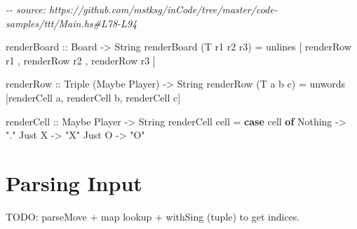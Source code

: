 \documentclass[]{article}
\newenvironment{Shaded}{}{}
\newcommand{\CommentTok}[1]{\textcolor[rgb]{0.38,0.63,0.69}{\textit{#1}}}
\newcommand{\DataTypeTok}[1]{\textcolor[rgb]{0.56,0.13,0.00}{#1}}
\newcommand{\FunctionTok}[1]{\textcolor[rgb]{0.02,0.16,0.49}{#1}}
\newcommand{\KeywordTok}[1]{\textcolor[rgb]{0.00,0.44,0.13}{\textbf{#1}}}
\newcommand{\NormalTok}[1]{#1}
\newcommand{\OtherTok}[1]{\textcolor[rgb]{0.00,0.44,0.13}{#1}}
\newcommand{\StringTok}[1]{\textcolor[rgb]{0.25,0.44,0.63}{#1}}
\begin{document}
\begin{Shaded}
\begin{Highlighting}[]
\CommentTok{{-}{-} source: https://github.com/mstksg/inCode/tree/master/code{-}samples/ttt/Main.hs\#L78{-}L94}

\OtherTok{renderBoard ::} \DataTypeTok{Board} \OtherTok{{-}\textgreater{}} \DataTypeTok{String}
\NormalTok{renderBoard (}\DataTypeTok{T}\NormalTok{ r1 r2 r3) }\OtherTok{=}
    \FunctionTok{unlines}
\NormalTok{        [ renderRow r1}
\NormalTok{        , renderRow r2}
\NormalTok{        , renderRow r3}
\NormalTok{        ]}

\OtherTok{renderRow ::} \DataTypeTok{Triple}\NormalTok{ (}\DataTypeTok{Maybe} \DataTypeTok{Player}\NormalTok{) }\OtherTok{{-}\textgreater{}} \DataTypeTok{String}
\NormalTok{renderRow (}\DataTypeTok{T}\NormalTok{ a b c) }\OtherTok{=}
    \FunctionTok{unwords}\NormalTok{ [renderCell a, renderCell b, renderCell c]}

\OtherTok{renderCell ::} \DataTypeTok{Maybe} \DataTypeTok{Player} \OtherTok{{-}\textgreater{}} \DataTypeTok{String}
\NormalTok{renderCell cell }\OtherTok{=} \KeywordTok{case}\NormalTok{ cell }\KeywordTok{of}
    \DataTypeTok{Nothing} \OtherTok{{-}\textgreater{}} \StringTok{"."}
    \DataTypeTok{Just} \DataTypeTok{X} \OtherTok{{-}\textgreater{}} \StringTok{"X"}
    \DataTypeTok{Just} \DataTypeTok{O} \OtherTok{{-}\textgreater{}} \StringTok{"O"}
\end{Highlighting}
\end{Shaded}

\section{Parsing Input}\label{parsing-input}

TODO: parseMove + map lookup + withSing (tuple) to get indices.
\end{document}
